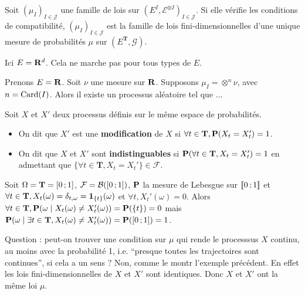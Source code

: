 	\begin{thm}
		Soit $(\mu_I)_{I \in \mathcal{J}}$ une famille de lois sur $\left( E^I, \mathcal{E}^{\otimes I} \right)_{I \in \mathcal{J}}$.
		Si elle vérifie les conditions de compatibilité, $(\mu_I)_{I \in \mathcal{J}}$ est la famille de lois fini-dimensionnelles d'une unique mesure de probabilités $\mu$ sur $\left( E^{\mathbf{T}}, \mathcal{G} \right)$.
	\end{thm}
	
	{\Large \noindent\lightning} Ici $E = \mathbf{R}^d$. Cela ne marche pas pour tous types de $E$.
	
	\begin{ex}
		Prenons $E = \mathbf{R}$.
		Soit $\nu$ une mesure sur $\mathbf{R}$.
		Supposons $\mu_I = \otimes^n \nu$, avec $n = \operatorname{Card}(I)$.
		Alors il existe un processus aléatoire tel que ...
	\end{ex}
	
	\begin{defn}
		Soit $X$ et $X'$ deux processus définis sur le même espace de probabilités.
		\begin{itemize}
			\item[\textbullet] On dit que $X'$ est une \textbf{modification} de $X$ si $\forall t \in \mathbf{T}, \mathbf{P}(X_t = X_t') = 1$.
			\item[\textbullet] On dit que $X$ et $X'$ sont \textbf{indistinguables} si $\mathbf{P}(\forall t \in \mathbf{T}, X_t = X_t') = 1$ en admettant que $\{ \forall t \in \mathbf{T}, X_t = X_t' \} \in \mathcal{F}$.
		\end{itemize}
	\end{defn}
	
	\begin{ex}
		Soit $\Omega = \mathbf{T} = \mathopen{[}0\mathclose{}\mathpunct{};1\mathclose{]}$, $\mathcal{F} = \mathcal{B}(\mathopen{[}0\mathclose{}\mathpunct{};1\mathclose{]})$, $\mathbf{P}$ la mesure de Lebesgue sur $\mathopen{[\![}0\mathclose{}\mathpunct{};1\mathclose{]\!]}$ et $\forall t \in \mathbf{T}, X_t(\omega) = \delta_{t,\omega} = \operatorname{\mathbf{1}}_{ \{ t \} }(\omega)$ et $\forall t, X_t'(\omega) = 0$.
		Alors $\forall t \in \mathbf{T}, \mathbf{P}( \omega \mid X_t(\omega) \neq X_t'(\omega) ) = \mathbf{P}( \{ t \} ) = 0$ mais $\mathbf{P}( \omega \mid \exists t \in \mathbf{T}, X_t(\omega) \neq X_t'(\omega) ) = \mathbf{P}(\mathopen{[}0\mathclose{}\mathpunct{};1\mathclose{]}) = 1$.
	\end{ex}
	
	Question : peut-on trouver une condition sur $\mu$ qui rende le processsus $X$ continu, au moins avec la probabilité 1, i.e. “presque toutes les trajectoires sont continues”, si cela a un sens ?
	Non, comme le montr l'exemple précédent.
	En effet les lois fini-dimensionnelles de $X$ et $X'$ sont identiques.
	Donc $X$ et $X'$ ont la même loi $\mu$.
	
